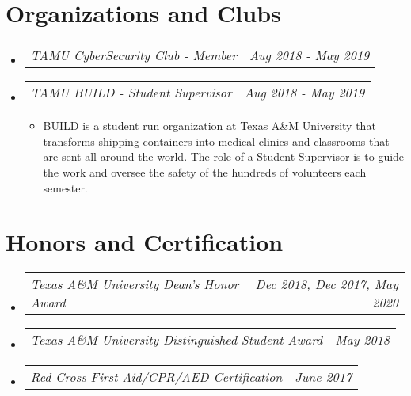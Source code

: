 \documentclass[letterpaper,11pt]{article}
\makeatletter
\newcommand{\resumeAward}[2]{
  \vspace{-1pt}
    \item\begin{tabular*}{0.97\textwidth}{l@{\extracolsep{\fill}}r}
    \textit{\small#1} & \textit{\small #2} \\
    \end{tabular*}\vspace{-20pt}
}
\newcommand{\resumeJobDesc}[1]{
  \item\small{{ #1 \vspace{-2pt}}
  }
}
\newcommand{\resumeSubHeadingListStart}{\begin{itemize}[leftmargin=*]}
\newcommand{\resumeSubHeadingListEnd}{\end{itemize}}
\newcommand{\resumeItemListStart}{\begin{itemize}}
\newcommand{\resumeItemListEnd}{\end{itemize}\vspace{-5pt}}
\makeatother
\begin{document}
\section{Organizations and Clubs}
\resumeSubHeadingListStart
        \resumeAward{TAMU CyberSecurity Club - Member}{Aug 2018 - May 2019}
        \resumeAward{TAMU BUILD - Student Supervisor}{Aug 2018 - May 2019}
        \vspace{3pt}
        \resumeItemListStart
                \resumeJobDesc{BUILD is a student run organization at Texas A\&M University that transforms shipping containers into medical clinics and classrooms that are sent all around the world. The role of a Student Supervisor is to guide the work and oversee the safety of the hundreds of volunteers each semester.}
        \resumeItemListEnd
\resumeSubHeadingListEnd

\section{Honors and Certification}
  \resumeSubHeadingListStart
    \resumeAward{Texas A\&M University Dean's Honor Award}{Dec 2018, Dec 2017, May 2020}
    \resumeAward{Texas A\&M University Distinguished Student Award}{May 2018}
    \resumeAward{Red Cross First Aid/CPR/AED Certification}{June 2017}
\resumeSubHeadingListEnd
\vspace{5pt}

\end{document}
